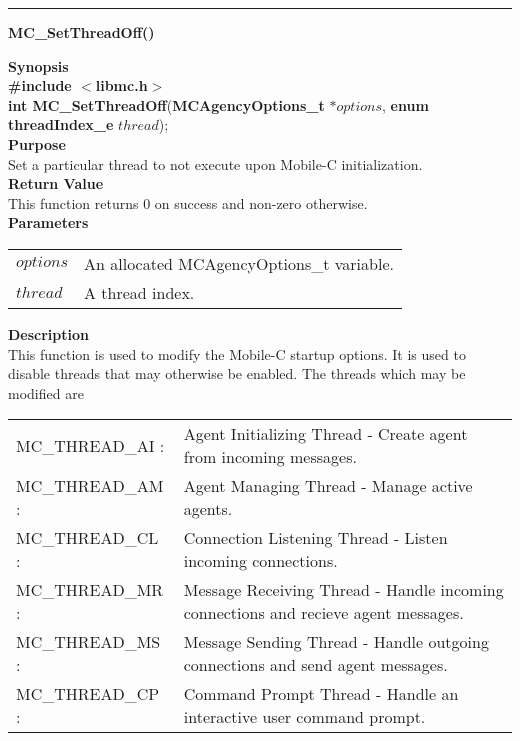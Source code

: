 \noindent
\vspace{5pt}
\rule{6.5in}{0.015in}
\noindent
{\LARGE \bf MC\_SetThreadOff()}\\
{}

\noindent
{\bf Synopsis}\\
{\bf \#include $<$libmc.h$>$}\\
{\bf int MC\_SetThreadOff}({\bf MCAgencyOptions\_t} $*options$, {\bf enum threadIndex\_e} $thread$);\\

\noindent
{\bf Purpose}\\
Set a particular thread to not execute upon Mobile-C initialization.\\

\noindent
{\bf Return Value}\\
This function returns 0 on success and non-zero otherwise. \\

\noindent
{\bf Parameters}
\vspace{-0.1in}
\begin{description}
\item               
\begin{tabular}{p{10 mm}p{145 mm}}
$options$ & An allocated MCAgencyOptions\_t variable.\\
$thread$ & A thread index.
\end{tabular}
\end{description}

\noindent
{\bf Description}\\
This function is used to modify the Mobile-C startup options. 
It is used to disable threads that may otherwise be enabled. 
The threads which may be modified are
\vspace{-0.1in}
\begin{description}
\item               
\begin{tabular}{p{40 mm}p{125 mm}}
MC\_THREAD\_AI : & Agent Initializing Thread - Create agent from incoming messages.\\
MC\_THREAD\_AM : & Agent Managing Thread - Manage active agents.\\
MC\_THREAD\_CL : & Connection Listening Thread - Listen incoming connections.\\
MC\_THREAD\_MR : & Message Receiving Thread - Handle incoming connections and recieve agent messages.\\
MC\_THREAD\_MS : & Message Sending Thread - Handle outgoing connections and send agent messages.\\
MC\_THREAD\_CP : & Command Prompt Thread - Handle an interactive user command prompt.
\end{tabular}
\end{description}

